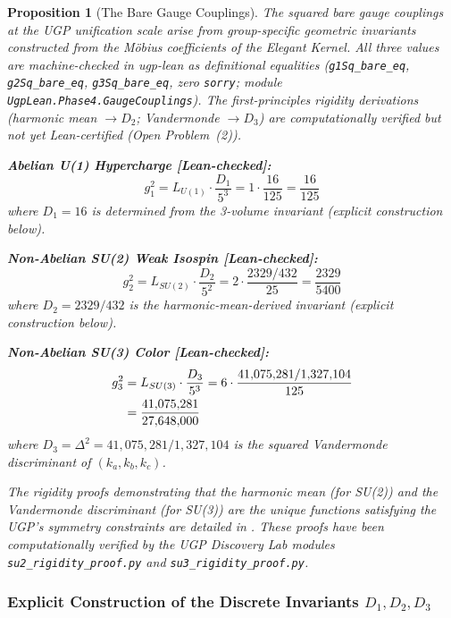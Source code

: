 \documentclass[11pt,twocolumn]{article}
\newtheorem{proposition}{Proposition}[section]
\begin{document}
\begin{proposition}[The Bare Gauge Couplings]
\label{prop:bare_couplings}
The squared bare gauge couplings at the UGP unification scale arise from group-specific geometric invariants constructed from the Möbius coefficients of the Elegant Kernel. All three values are machine-checked in ugp-lean as definitional equalities (\texttt{g1Sq\_bare\_eq}, \texttt{g2Sq\_bare\_eq}, \texttt{g3Sq\_bare\_eq}, zero \texttt{sorry}; module \texttt{UgpLean.Phase4.GaugeCouplings}). The first-principles rigidity derivations (harmonic mean $\to D_2$; Vandermonde $\to D_3$) are computationally verified but not yet Lean-certified (Open Problem~(2)).

\textbf{Abelian U(1) Hypercharge [Lean-checked]:}
\begin{equation}
    g_1^2 = L_{U(1)} \cdot \frac{D_1}{5^3} = 1 \cdot \frac{16}{125} = \frac{16}{125}
\end{equation}
where $D_1 = 16$ is determined from the 3-volume invariant (explicit construction below).

\textbf{Non-Abelian SU(2) Weak Isospin [Lean-checked]:}
\begin{equation}
    g_2^2 = L_{SU(2)} \cdot \frac{D_2}{5^2} = 2 \cdot \frac{2329/432}{25} = \frac{2329}{5400}
\end{equation}
where $D_2 = 2329/432$ is the harmonic-mean-derived invariant (explicit construction below).

\textbf{Non-Abelian SU(3) Color [Lean-checked]:}
\begin{align}
    g_3^2 &= L_{SU(3)} \cdot \frac{D_3}{5^3} = 6 \cdot \frac{41{,}075{,}281/1{,}327{,}104}{125} \notag \\
          &= \frac{41{,}075{,}281}{27{,}648{,}000}
\end{align}
where $D_3 = \Delta^2 = 41{,}075{,}281/1{,}327{,}104$ is the squared Vandermonde discriminant of $(k_a, k_b, k_c)$.

The rigidity proofs demonstrating that the harmonic mean (for SU(2)) and the Vandermonde discriminant (for SU(3)) are the unique functions satisfying the UGP's symmetry constraints are detailed in . These proofs have been computationally verified by the UGP Discovery Lab modules \texttt{su2\_rigidity\_proof.py} and \texttt{su3\_rigidity\_proof.py}.
\end{proposition}

\subsubsection{Explicit Construction of the Discrete Invariants $D_1, D_2, D_3$}
\end{document}
